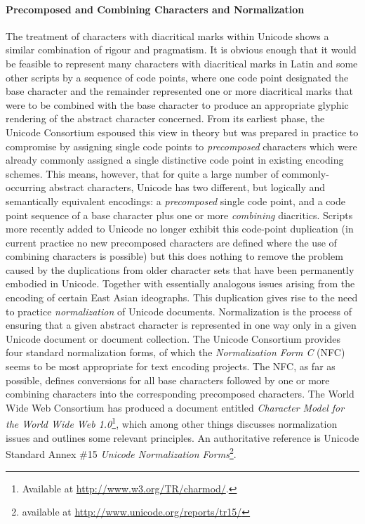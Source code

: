 \paragraph[{Precomposed and Combining Characters and Normalization}]{Precomposed and Combining Characters and Normalization}\label{D4-46-2}\par
The treatment of characters with diacritical marks within Unicode shows a similar combination of rigour and pragmatism. It is obvious enough that it would be feasible to represent many characters with diacritical marks in Latin and some other scripts by a sequence of code points, where one code point designated the base character and the remainder represented one or more diacritical marks that were to be combined with the base character to produce an appropriate glyphic rendering of the abstract character concerned. From its earliest phase, the Unicode Consortium espoused this view in theory but was prepared in practice to compromise by assigning single code points to \textit{precomposed} characters which were already commonly assigned a single distinctive code point in existing encoding schemes. This means, however, that for quite a large number of commonly-occurring abstract characters, Unicode has two different, but logically and semantically equivalent encodings: a \textit{precomposed} single code point, and a code point sequence of a base character plus one or more \textit{combining} diacritics. Scripts more recently added to Unicode no longer exhibit this code-point duplication (in current practice no new precomposed characters are defined where the use of combining characters is possible) but this does nothing to remove the problem caused by the duplications from older character sets that have been permanently embodied in Unicode. Together with essentially analogous issues arising from the encoding of certain East Asian ideographs. This duplication gives rise to the need to practice \textit{normalization} of Unicode documents. Normalization is the process of ensuring that a given abstract character is represented in one way only in a given Unicode document or document collection. The Unicode Consortium provides four standard normalization forms, of which the \textit{Normalization Form C} (NFC) seems to be most appropriate for text encoding projects. The NFC, as far as possible, defines conversions for all base characters followed by one or more combining characters into the corresponding precomposed characters. The World Wide Web Consortium has produced a document entitled \textit{Character Model for the World Wide Web 1.0}\footnote{Available at \url{http://www.w3.org/TR/charmod/}.}, which among other things discusses normalization issues and outlines some relevant principles. An authoritative reference is Unicode Standard Annex \#15 \textit{Unicode Normalization Forms}\footnote{available at \url{http://www.unicode.org/reports/tr15/}}.\par
